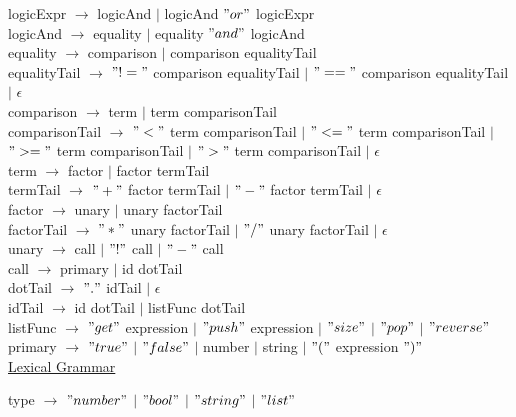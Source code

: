 \documentclass{article}
\begin{document}
logicExpr $\rightarrow$ logicAnd  $\vert$ logicAnd $"or"$ logicExpr \\

logicAnd $\rightarrow$ equality $\vert$ equality $"and"$ logicAnd \\

equality $\rightarrow$ comparison $\vert$ comparison equalityTail \\

equalityTail $\rightarrow$ $"!="$ comparison equalityTail $\vert$ $"=="$ comparison equalityTail $\vert$ $\epsilon$ \\

comparison $\rightarrow$ term $\vert$ term comparisonTail \\

comparisonTail $\rightarrow$ $"<"$ term comparisonTail $\vert$ $"<="$ term comparisonTail $\vert$ $">="$ term comparisonTail $\vert$ $">"$ term comparisonTail $\vert$ $\epsilon$ \\

term $\rightarrow$ factor $\vert$ factor termTail \\

termTail $\rightarrow$ $"+"$ factor termTail $\vert$ $"-"$ factor termTail $\vert$ $\epsilon$ \\

factor $\rightarrow$ unary $\vert$ unary factorTail \\

factorTail $\rightarrow$ $"*"$ unary factorTail $\vert$ $"/"$ unary factorTail $\vert$ $\epsilon$ \\

unary $\rightarrow$ call $\vert$ $"!"$ call $\vert$ $"-"$ call \\

call $\rightarrow$ primary $\vert$ id dotTail \\

dotTail $\rightarrow$ $"."$ idTail $\vert$ $\epsilon$ \\

idTail $\rightarrow$ id dotTail $\vert$ listFunc dotTail \\

listFunc $\rightarrow$ $"get"$ expression $\vert$ $"push"$ expression $\vert$ $"size"$ $\vert$ $"pop"$ $\vert$ $"reverse"$ \\

primary $\rightarrow$ $"true"$ $\vert$ $"false"$ $\vert$ number $\vert$ string $\vert$ $"("$ expression $")"$ \\

\underline{Lexical Grammar}

type $\rightarrow$ $"number"$ $\vert$ $"bool"$ $\vert$ $"string"$ $\vert$ $"list"$ \\
\end{document}
